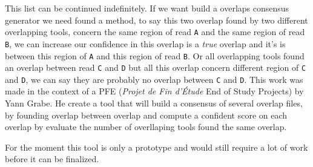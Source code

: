 \documentclass[main.tex]{subfiles}
\begin{document}
This list can be continued indefinitely. If we want build a overlaps consensus generator we need found a method, to say this two overlap found by two different overlapping tools, concern the same region of read \texttt{A} and the same region of read \texttt{B}, we can increase our confidence in this overlap is a \textit{true} overlap and it's is between this region of \texttt{A} and this region of read \texttt{B}. Or all overlapping tools found an overlap between read \texttt{C} and \texttt{D} but all this overlap concern different region of \texttt{C} and \texttt{D}, we can say they are probably no overlap between \texttt{C} and \texttt{D}.
This work was made in the context of a PFE (\textit{Projet de Fin d'Étude} End of Study Projects) by Yann Grabe. He create a tool that will build a consensus of several overlap files, by founding overlap between overlap and compute a confident score on each overlap by evaluate the number of overllaping tools found the same overlap.

For the moment this tool is only a prototype and would still require a lot of work before it can be finalized. 

%
%
\end{document}
